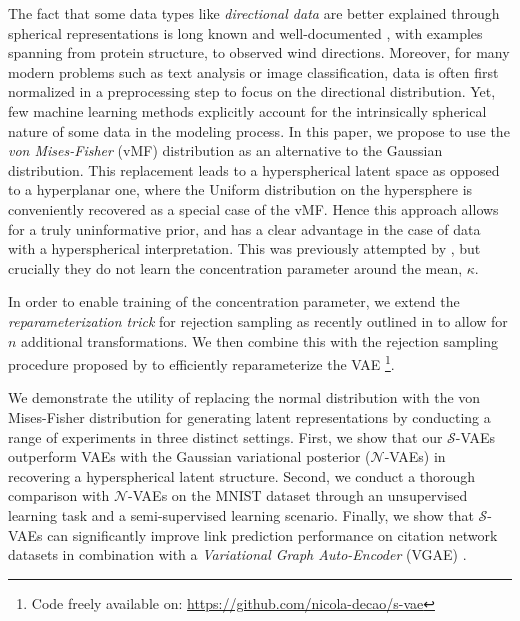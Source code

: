 \documentclass[letterpaper]{article}
\newcommand{\Sv}{$\mathcal{S}$}
\newcommand{\Nv}{$\mathcal{N}$}
\begin{document}
The fact that some data types like \textit{directional data} are better explained through spherical representations is long known and well-documented \citep{mardia1975statistics, fisher1987statistical}, with examples spanning from protein structure, to observed wind directions. Moreover, for many modern problems such as text analysis or image classification, data is often first normalized in a preprocessing step to focus on the directional distribution. Yet, few machine learning methods explicitly account for the intrinsically spherical nature of some data in the modeling process. In this paper, we propose to use the \textit{von Mises-Fisher} (vMF) distribution as an alternative to the Gaussian distribution. This replacement leads to a hyperspherical latent space as opposed to a hyperplanar one, where the Uniform distribution on the hypersphere is conveniently recovered as a special case of the vMF. Hence this approach allows for a truly uninformative prior, and has a clear advantage in the case of data with a hyperspherical interpretation. This was previously attempted by \cite{hasnat2017mises}, but crucially they do not learn the concentration parameter around the mean, $\kappa$.

In order to enable training of the concentration parameter, we extend the \textit{reparameterization trick} for rejection sampling as recently outlined in \cite{rejection-repar} to allow for $n$ additional transformations. We then combine this with the rejection sampling procedure proposed by \cite{sample-vmf} to efficiently reparameterize the VAE \footnote{Code freely  available on: \url{https://github.com/nicola-decao/s-vae}}.

We demonstrate the utility of replacing the normal distribution with the von Mises-Fisher distribution for generating latent representations by conducting a range of experiments in three distinct settings. First, we show that our \Sv-VAEs outperform VAEs with the Gaussian variational posterior (\Nv-VAEs) in recovering a hyperspherical latent structure. Second, we conduct a thorough comparison with \Nv-VAEs on the MNIST dataset through an unsupervised learning task and a semi-supervised learning scenario. Finally, we show that \Sv-VAEs can significantly improve link prediction performance on citation network datasets in combination with a \textit{Variational Graph Auto-Encoder} (VGAE) \citep{kipf2016VGAE}. 
\end{document}
